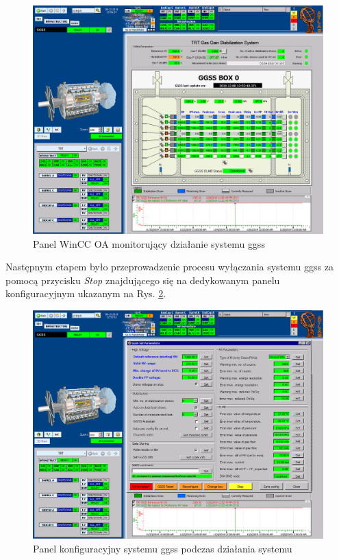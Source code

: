 \begin{figure}[H]
\centering
\includegraphics[width=\textwidth]{res/png/ggssStraw}
\caption{Panel WinCC OA monitorujący działanie systemu \gls*{ggss}}
\label{fig:ggss}
\end{figure}

\newpage
Następnym etapem było przeprowadzenie procesu wyłączania systemu \gls*{ggss} za pomocą przycisku \textit{Stop} znajdującego się na dedykowanym panelu konfiguracyjnym ukazanym na Rys. \ref{fig:ggsspanel}. 

\begin{figure}[H]
\centering
\includegraphics[width=\textwidth]{res/png/ggssConfig}
\caption{Panel konfiguracyjny systemu \gls*{ggss} podczas działania systemu}
\label{fig:ggsspanel}
\end{figure}


